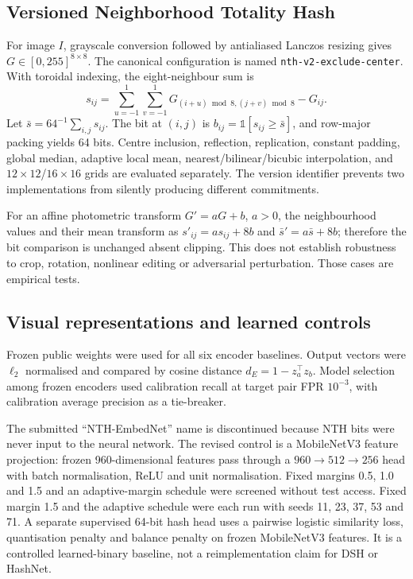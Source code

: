 \documentclass[12pt]{article}
\begin{document}
\subsection{Versioned Neighborhood Totality Hash}

For image $I$, grayscale conversion followed by antialiased Lanczos resizing gives $G\in[0,255]^{8\times8}$. The canonical configuration is named \texttt{nth-v2-exclude-center}. With toroidal indexing, the eight-neighbour sum is
\begin{equation}
  s_{ij}=\sum_{u=-1}^{1}\sum_{v=-1}^{1}G_{(i+u)\bmod8,(j+v)\bmod8}-G_{ij}.
\end{equation}
Let $\bar{s}=64^{-1}\sum_{i,j}s_{ij}$. The bit at $(i,j)$ is $b_{ij}=\mathbb{1}[s_{ij}\geq\bar{s}]$, and row-major packing yields 64 bits. Centre inclusion, reflection, replication, constant padding, global median, adaptive local mean, nearest/bilinear/bicubic interpolation, and $12\times12$/$16\times16$ grids are evaluated separately. The version identifier prevents two implementations from silently producing different commitments.

For an affine photometric transform $G'=aG+b$, $a>0$, the neighbourhood values and their mean transform as $s'_{ij}=as_{ij}+8b$ and $\bar{s}'=a\bar{s}+8b$; therefore the bit comparison is unchanged absent clipping. This does not establish robustness to crop, rotation, nonlinear editing or adversarial perturbation. Those cases are empirical tests.

\subsection{Visual representations and learned controls}

Frozen public weights were used for all six encoder baselines. Output vectors were $\ell_2$ normalised and compared by cosine distance $d_E=1-z_a^\top z_b$. Model selection among frozen encoders used calibration recall at target pair FPR $10^{-3}$, with calibration average precision as a tie-breaker.

The submitted ``NTH-EmbedNet'' name is discontinued because NTH bits were never input to the neural network. The revised control is a MobileNetV3 feature projection: frozen 960-dimensional features pass through a $960\rightarrow512\rightarrow256$ head with batch normalisation, ReLU and unit normalisation. Fixed margins 0.5, 1.0 and 1.5 and an adaptive-margin schedule were screened without test access. Fixed margin 1.5 and the adaptive schedule were each run with seeds 11, 23, 37, 53 and 71. A separate supervised 64-bit hash head uses a pairwise logistic similarity loss, quantisation penalty and balance penalty on frozen MobileNetV3 features. It is a controlled learned-binary baseline, not a reimplementation claim for DSH or HashNet.
\end{document}
